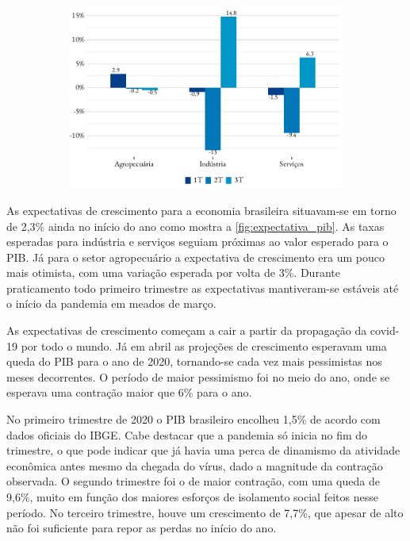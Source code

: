 \begin{figure}[!h]
\begin{subfigure}{\linewidth}
		\includegraphics{fig/pib_oferta.pdf}
		\notes{\trimestres[1-3]}
	\end{subfigure}
\end{figure}
\par As expectativas de crescimento para a economia brasileira situavam-se em torno de 2,3\% ainda no início do ano como mostra a \ref{fig:expectativa_pib}. As taxas esperadas para indústria e serviços seguiam próximas ao valor esperado para o PIB. Já para o setor agropecuário a expectativa de crescimento era um pouco mais otimista, com uma variação esperada por volta de 3\%. Durante praticamento todo primeiro trimestre as expectativas mantiveram-se estáveis até o início da pandemia em meados de março.
\par As expectativas de crescimento começam a cair a partir da propagação da covid-19 por todo o mundo. Já em abril as projeções de crescimento esperavam uma queda do PIB para o ano de 2020, tornando-se cada vez mais pessimistas nos meses decorrentes. O período de maior pessimismo foi no meio do ano, onde se esperava uma contração maior que 6\% para o ano.
\par No primeiro trimestre de 2020 o PIB brasileiro encolheu 1,5\% de acordo com dados oficiais do IBGE. Cabe destacar que a pandemia só inicia no fim do trimestre, o que pode indicar que já havia uma perca de dinamismo da atividade econômica antes mesmo da chegada do vírus, dado a magnitude da contração observada. O segundo trimestre foi o de maior contração, com uma queda de 9,6\%, muito em função dos maiores esforços de isolamento social feitos nesse período. No terceiro trimestre, houve um crescimento de 7,7\%, que apesar de alto não foi suficiente para repor as perdas no início do ano.
